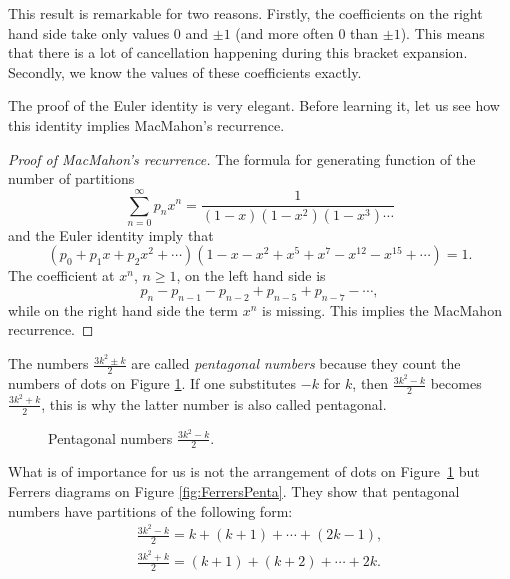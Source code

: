 \begin{page}
\setcounter{section}{3}
\setcounter{subsection}{8}
\setcounter{dfn}{20}
\label{portion:847}


This result is remarkable for two reasons.
Firstly, the coefficients on the right hand side take only values $0$ and $\pm 1$ (and more often $0$ than $\pm 1$).
This means that there is a lot of cancellation happening during this bracket expansion.
Secondly, we know the values of these coefficients exactly.

The proof of the Euler identity is very elegant.
Before learning it, let us see how this identity implies MacMahon's recurrence.

\begin{proof}[Proof of MacMahon's recurrence]
The formula for generating function of the number of partitions
\[
\sum_{n=0}^\infty p_n x^n = \frac{1}{(1-x)(1-x^2)(1-x^3) \cdots}
\]
and the Euler identity imply that
\[
(p_0 + p_1 x + p_2 x^2 + \cdots)(1 - x - x^2 + x^5 + x^7 - x^{12} - x^{15} + \cdots) = 1.
\]
The coefficient at $x^n$, $n \ge 1$, on the left hand side is
\[
p_n - p_{n-1} - p_{n-2} + p_{n-5} + p_{n-7} - \cdots,
\]
while on the right hand side the term $x^n$ is missing.
This implies the MacMahon recurrence.
\end{proof}


The numbers $\frac{3k^2 \pm k}{2}$ are called \emph{pentagonal numbers}
because they count the numbers of dots on Figure \ref{fig:PentaNumber}.
If one substitutes $-k$ for $k$, then $\frac{3k^2 - k}{2}$ becomes $\frac{3k^2 + k}{2}$,
this is why the latter number is also called pentagonal.

\begin{figure}[ht]
\begin{center}

\end{center}
\caption{Pentagonal numbers $\frac{3k^2 - k}{2}$.}
\label{fig:PentaNumber}
\end{figure}

What is of importance for us is not the arrangement of dots on Figure~\ref{fig:PentaNumber}
but Ferrers diagrams on Figure \ref{fig:FerrersPenta}.
They show that pentagonal numbers have partitions of the following form:
\begin{gather*}
\frac{3k^2-k}{2} = k + (k+1) + \cdots + (2k-1),\\
\frac{3k^2+k}{2} = (k+1) + (k+2) + \cdots + 2k.
\end{gather*}


\end{page}
